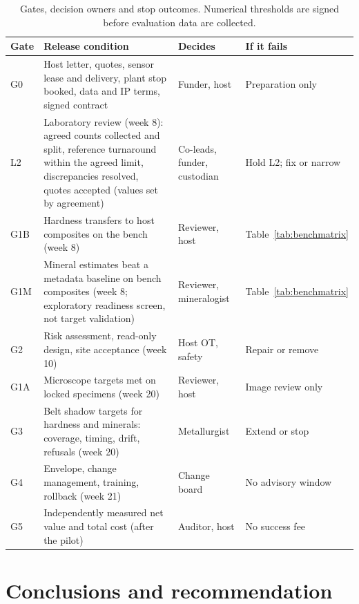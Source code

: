 \documentclass[10pt,a4paper,twocolumn]{article}
\begin{document}
\begin{table}[t]
\centering\footnotesize
\caption{Gates, decision owners and stop outcomes. Numerical thresholds are signed before evaluation data are collected.}
\label{tab:milestones}
\begin{tabularx}{\columnwidth}{@{}L{0.55cm}YL{1.25cm}L{1.3cm}@{}}
\toprule
Gate & Release condition & Decides & If it fails \\
\midrule
G0 & Host letter, quotes, sensor lease and delivery, plant stop booked, data and IP terms, signed contract & Funder, host & Preparation only \\
L2 & Laboratory review (week 8): agreed counts collected and split, reference turnaround within the agreed limit, discrepancies resolved, quotes accepted (values set by agreement) & Co-leads, funder, custodian & Hold L2; fix or narrow \\
G1B & Hardness transfers to host composites on the bench (week 8) & Reviewer, host & Table~\ref{tab:benchmatrix} \\
G1M & Mineral estimates beat a metadata baseline on bench composites (week 8; exploratory readiness screen, not target validation) & Reviewer, mineralogist & Table~\ref{tab:benchmatrix} \\
G2 & Risk assessment, read-only design, site acceptance (week 10) & Host OT, safety & Repair or remove \\
G1A & Microscope targets met on locked specimens (week 20) & Reviewer, host & Image review only \\
G3 & Belt shadow targets for hardness and minerals: coverage, timing, drift, refusals (week 20) & Metallurgist & Extend or stop \\
G4 & Envelope, change management, training, rollback (week 21) & Change board & No advisory window \\
G5 & Independently measured net value and total cost (after the pilot) & Auditor, host & No success fee \\
\bottomrule
\end{tabularx}
\end{table}





\section{Conclusions and recommendation}
\end{document}
